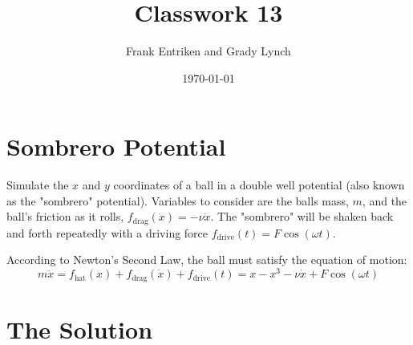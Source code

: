 \documentclass[aps,pra,notitlepage,amsmath,amssymb,letterpaper,12pt]{revtex4-1}
\newenvironment{problem}[2][Problem]{\begin{trivlist}
\item[\hskip \labelsep {\bfseries #1}\hskip \labelsep {\bfseries #2.}]}{\end{trivlist}}
\begin{document}
\title{Classwork 13}
\author{Frank Entriken and Grady Lynch}
\date{\today}

\maketitle

\section{Sombrero Potential}

\begin{problem}{Specifications}
Simulate the $x$ and $y$ coordinates of a ball in a double well potential (also known as the "sombrero" potential). Variables to consider are the balls mass, $m$, and the ball's friction as it rolls, $f_{\text{drag}}(\dot{x}) = -\nu \dot{x}$. The "sombrero" will be shaken back and forth repeatedly with a driving force $f_{\text{drive}}(t) = F\cos(\omega t)$.

According to Newton's Second Law, the ball must satisfy the equation of motion: $$m\ddot{x} = f_{\text{hat}}(x) + f_{\text{drag}}(\dot{x}) + f_{\text{drive}}(t) = x - x^3 - \nu \dot{x} + F\cos(\omega t)$$
\end{problem}

\section{The Solution}
\end{document}
